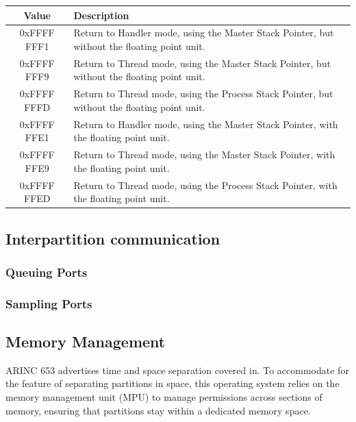 \begin{table}[H]

	\centering
	\begin{tabular}{|c|p{10cm}|}
		\hline
		Value			&	Description 	\\
		\hline
		0xFFFF FFF1 	&	Return to Handler mode, using the Master Stack Pointer, but without the floating point unit.	\\
		\hline
		0xFFFF FFF9		&	Return to Thread mode, using the Master Stack Pointer, but without the floating point unit.		\\
		\hline
		0xFFFF FFFD		&	Return to Thread mode, using the Process Stack Pointer, but without the floating point unit.	\\
		\hline
		0xFFFF FFE1		&	Return to Handler mode, using the Master Stack Pointer, with the floating point unit.			\\
		\hline
		0xFFFF FFE9		&	Return to Thread mode, using the Master Stack Pointer, with the floating point unit.			\\
		\hline
		0xFFFF FFED		&	Return to Thread mode, using the Process Stack Pointer, with the floating point unit.			\\
		\hline
	\end{tabular}
	\label{tab:exc-return}
\end{table}

\subsection{Interpartition communication}

\subsubsection{Queuing Ports}

\subsubsection{Sampling Ports}


\subsection{Memory Management}
ARINC 653 advertises time and space separation covered in.
To accommodate for the feature of separating partitions in space,
this operating system relies on the memory management unit (MPU)
to manage permissions across sections of memory,
ensuring that partitions stay within a dedicated memory space.

